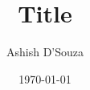 \documentclass[12pt,letterpaper]{article}
\title{Title}
\date{\today}
\author{Ashish D'Souza}
\begin{document}
  \begin{center}
    {\LARGE{
      \@title
    }}

    \bigskip

    \textit{\@date}
    \makeatother
  \end{center}


\end{document}
